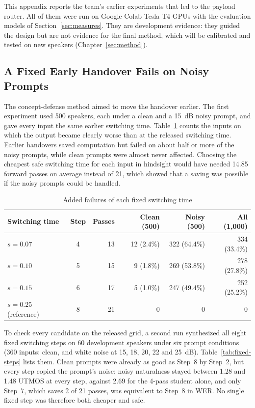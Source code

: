 This appendix reports the team's earlier experiments that led to the payload router. All of them were run on Google Colab Tesla T4 GPUs with the evaluation models of Section~\ref{sec:measures}. They are development evidence: they guided the design but are not evidence for the final method, which will be calibrated and tested on new speakers (Chapter~\ref{sec:method}).

\subsection{A Fixed Early Handover Fails on Noisy Prompts}
\label{app:prelim-fixed}

The concept-defense method aimed to move the handover earlier. The first experiment used 500 speakers, each under a clean and a 15~dB noisy prompt, and gave every input the same earlier switching time. Table~\ref{tab:fixed-fail} counts the inputs on which the output became clearly worse than at the released switching time. Earlier handovers saved computation but failed on about half or more of the noisy prompts, while clean prompts were almost never affected. Choosing the cheapest safe switching time for each input in hindsight would have needed 14.85 forward passes on average instead of 21, which showed that a saving was possible if the noisy prompts could be handled.

\begin{table}[!htbp]
\centering\small
\caption{Added failures of each fixed switching time}
\label{tab:fixed-fail}
\setlength{\tabcolsep}{5pt}
\begin{tabular}{@{}l c r r r r@{}}
\toprule
\textbf{Switching time} & \textbf{Step} & \textbf{Passes} & \textbf{Clean (500)} & \textbf{Noisy (500)} & \textbf{All (1{,}000)} \\
\midrule
$s=0.07$ & 4 & 13 & 12 (2.4\%) & 322 (64.4\%) & 334 (33.4\%) \\
$s=0.10$ & 5 & 15 & 9 (1.8\%) & 269 (53.8\%) & 278 (27.8\%) \\
$s=0.15$ & 6 & 17 & 5 (1.0\%) & 247 (49.4\%) & 252 (25.2\%) \\
$s=0.25$ (reference) & 8 & 21 & 0 & 0 & 0 \\
\bottomrule
\end{tabular}
\end{table}

To check every candidate on the released grid, a second run synthesized all eight fixed switching steps on 60 development speakers under six prompt conditions (360 inputs: clean, and white noise at 15, 18, 20, 22 and 25~dB). Table~\ref{tab:fixed-steps} lists them. Clean prompts were already as good as Step~8 by Step~2, but every step copied the prompt's noise: noisy naturalness stayed between 1.28 and 1.48 UTMOS at every step, against 2.69 for the 4-pass student alone, and only Step~7, which saves 2 of 21 passes, was equivalent to Step~8 in WER. No single fixed step was therefore both cheaper and safe.

